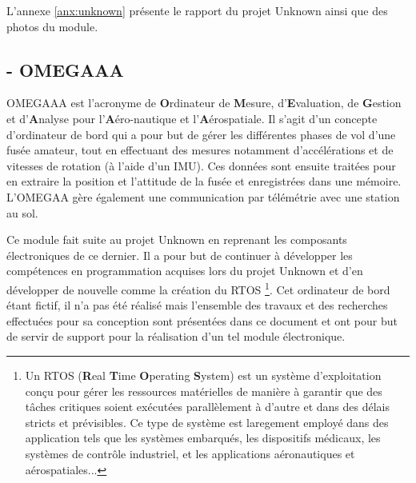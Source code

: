 L'annexe \ref{anx:unknown} présente le rapport du projet Unknown ainsi que des
photos du module.

\subsection*{- OMEGAAA}
OMEGAAA est l'acronyme de \textbf{O}rdinateur de \textbf{M}esure,
d'\textbf{E}valuation, de \textbf{G}estion et d'\textbf{A}nalyse pour
l'\textbf{A}éro-nautique et l'\textbf{A}érospatiale. Il s'agit d'un concepte
d'ordinateur de bord qui a pour but de gérer les différentes phases de vol d'une
fusée amateur, tout en effectuant des mesures notamment d'accélérations et de
vitesses de rotation (à l'aide d'un IMU). Ces données sont ensuite traitées pour en
extraire la position et l'attitude de la fusée et enregistrées dans une mémoire.
L'OMEGAA gère également une communication par télémétrie avec une station au sol.

Ce module fait suite au projet Unknown en reprenant les composants électroniques de
ce dernier. Il a pour but de continuer à développer les compétences en
programmation acquises lors du projet Unknown et d'en développer de nouvelle comme
la création du RTOS \footnote{Un RTOS (\textbf{R}eal \textbf{T}ime
\textbf{O}perating \textbf{S}ystem)  est un système d'exploitation conçu pour gérer
les ressources matérielles de manière à garantir que des tâches critiques soient
exécutées parallèlement à d'autre et dans des délais stricts et prévisibles.
Ce type de système est laregement employé dans des application tels que les systèmes
embarqués, les dispositifs médicaux, les systèmes de contrôle industriel, et les
applications aéronautiques et aérospatiales...}. Cet ordinateur de bord étant
fictif, il n'a pas été réalisé mais l'ensemble des travaux et des recherches
effectuées pour sa conception sont présentées dans ce document et ont pour but de
servir de support pour la réalisation d'un tel module électronique.\\
